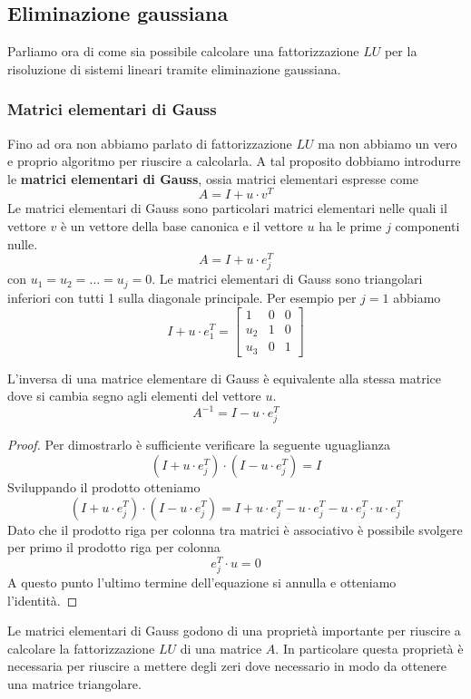 \subsection{Eliminazione gaussiana}
Parliamo ora di come sia possibile calcolare una fattorizzazione $LU$ per la risoluzione di sistemi lineari
tramite eliminazione gaussiana.

\subsubsection{Matrici elementari di Gauss}
Fino ad ora non abbiamo parlato di fattorizzazione $LU$ ma non abbiamo un vero e proprio algoritmo per riuscire a
calcolarla. A tal proposito dobbiamo introdurre le \textbf{matrici elementari di Gauss}, ossia matrici elementari
espresse come
\[ A = I + u \cdot v^T \]
Le matrici elementari di Gauss sono particolari matrici elementari nelle quali il vettore $v$ è un vettore della
base canonica e il vettore $u$ ha le prime $j$ componenti nulle.
\[ A = I + u \cdot e_j^T \]
con $u_1 = u_2 = \dots = u_j = 0$. Le matrici elementari di Gauss sono triangolari inferiori con tutti 1 sulla
diagonale principale. Per esempio per $j=1$ abbiamo
\[
	I + u \cdot e_1^T =
	\begin{bmatrix}
		1   & 0 & 0 \\
		u_2 & 1 & 0 \\
		u_3 & 0 & 1
	\end{bmatrix}
\]
\begin{theorem}
	L'inversa di una matrice elementare di Gauss è equivalente alla stessa matrice dove si cambia segno agli
	elementi del vettore $u$.
	\[ A^{-1} = I - u \cdot e_j^T \]
	\begin{proof}
		Per dimostrarlo è sufficiente verificare la seguente uguaglianza
		\[ (I + u \cdot e_j^T) \cdot (I - u \cdot e_j^T) = I \]
		Sviluppando il prodotto otteniamo
		\[
			(I + u \cdot e_j^T) \cdot (I - u \cdot e_j^T) =
			I + u \cdot e_j^T - u \cdot e_j^T - u \cdot e_j^T \cdot u \cdot e_j^T
		\]
		Dato che il prodotto riga per colonna tra matrici è associativo è possibile svolgere per primo il prodotto
		riga per colonna
		\[ e_j^T \cdot u = 0 \]
		A questo punto l'ultimo termine dell'equazione si annulla e otteniamo l'identità.
	\end{proof}
\end{theorem}

Le matrici elementari di Gauss godono di una proprietà importante per riuscire a calcolare la fattorizzazione
$LU$ di una matrice $A$. In particolare questa proprietà è necessaria per riuscire a mettere degli zeri dove
necessario in modo da ottenere una matrice triangolare.

